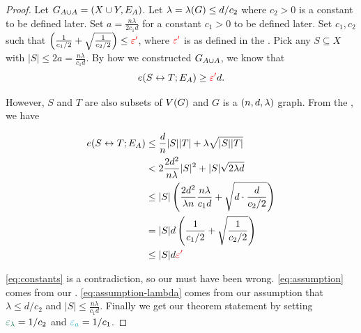 \documentclass[11pt]{article}
\begin{document}
\begin{proof}
Let $G_{A \cup A} = (X \cup Y, E_A)$. 
Let $\lambda = \lambda(G) \leq d/c_2$ where $c_2 > 0$ is a constant to be defined later.
Set $a = \frac{n\lambda}{2c_1 d}$ for a constant $c_1 > 0$ to be defined later.
Set $c_1, c_2$ such that $\left(\frac{1}{c_1/2}  + \sqrt{\frac{1}{c_2/2}}\right) \leq \textcolor{red}{\varepsilon'}$, where $\textcolor{red}{\varepsilon'}$ is as defined in the .
Pick any $S \subseteq X$ with $|S| \leq 2a = \frac{n\lambda}{c_1 d}$.
By how we constructed $G_{A \cup A}$, we know that
\[ e(S \leftrightarrow T; E_A) \geq \textcolor{red}{\varepsilon'} d.\]

However, $S$ and $T$ are also subsets of $V(G)$ and $G$ is a $(n, d, \lambda)$ graph.
From the , we have

\begin{align}
	e(S \leftrightarrow T; E_A) &\leq \frac{d}{n}|S||T| + \lambda\sqrt{|S||T|} \\
	&< 2\frac{2d^2}{n\lambda}|S|^2 + |S|\sqrt{2\lambda d} \label{eq:assumption}\\
	&\leq |S|\left(\frac{2d^2}{\lambda n} \frac{n\lambda}{c_1 d} + \sqrt{d\cdot \frac{d}{c_2/2}}\right) \label{eq:assumption-lambda}\\
	&= |S|d\left(\frac{1}{c_1/2}  + \sqrt{\frac{1}{c_2/2}}\right) \\
	&\leq |S|d\textcolor{red}{\varepsilon'} \label{eq:constants}
\end{align}


\eqref{eq:constants} is a contradiction, so our  must have been wrong.
\eqref{eq:assumption} comes from our .
\eqref{eq:assumption-lambda} comes from our assumption that $\lambda \leq d/c_2$ and $|S| \leq \frac{n\lambda}{c_1 d}$.
Finally we get our theorem statement by setting $\epsilonL = 1/c_2$ and $\epsilonA = 1/c_1$.


\end{proof}
\end{document}
